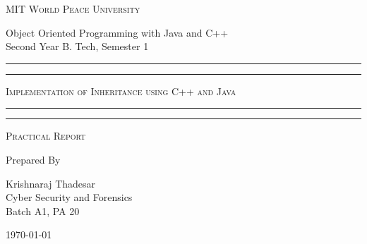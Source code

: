 \documentclass[11pt]{article}
\begin{document}
\begin{titlepage}
	\centering


	\huge\textsc{
		MIT World Peace University
	}\\

	\vspace{0.75\baselineskip} %

	\LARGE{
		Object Oriented Programming with Java and C++\\
		Second Year B. Tech, Semester 1
	}

	\vfill %


	\rule{\textwidth}{1.6pt}\vspace*{-\baselineskip}\vspace*{2pt}
	\rule{\textwidth}{0.6pt}
	\vspace{0.75\baselineskip} %



	\huge{\textsc{
			Implementation of Inheritance using C++ and Java
		}} \\



	\vspace{0.5\baselineskip} %
	\rule{\textwidth}{0.6pt}\vspace*{-\baselineskip}\vspace*{2.8pt}
	\rule{\textwidth}{1.6pt}

	\vspace{1\baselineskip} %


	\LARGE\textsc{
		Practical Report
	} %
	\vfill


	Prepared By
	\vspace{0.5\baselineskip} %

	\Large{
		Krishnaraj Thadesar \\
		Cyber Security and Forensics\\
		Batch A1, PA 20
	}


	\vspace{0.5\baselineskip} %
	\today

\end{titlepage}
\end{document}
